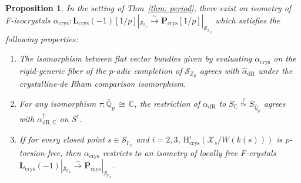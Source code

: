 \documentclass[11pt, letterpaper]{amsart}
\theoremstyle{plain}
\newtheorem{proposition}[theorem]{Proposition}
\theoremstyle{definition}
\newcommand{\IC}{\mathbb{C}}
\newcommand{\IF}{\mathbb{F}}
\newcommand{\IQ}{\mathbb{Q}}
\newcommand{\IZ}{\mathbb{Z}}
\newcommand\iso{\,{\cong}\,}
\newcommand{\<}{\langle}
\renewcommand{\>}{\rangle}
\newcommand{\sX}{\mathcal{X}}
\newcommand{\bL}{\mathbf{L}}
\renewcommand{\H}{\mathrm{H}}
\newcommand{\crys}{\mathrm{crys}}
\newcommand{\sS}{\mathcal{S}}
\newcommand{\bP}{\mathbf{P}}
\newcommand{\dR}{\mathrm{dR}}
\newcommand{\sto}{\stackrel{\sim}{\to}}
\begin{document}
\begin{proposition}
\label{prop: crystalline period} 
    In the setting of Thm~\ref{thm: period}, there exist an isometry of F-isocrystals $\alpha_\crys : \bL_\crys(-1)[1/p]|_{\sS_{\IF_p}} \sto \bP_\crys[1/p]|_{\sS_{\IF_p}}$ which satisfies the following properties: 
    \begin{enumerate}[label=\upshape{(\alph*)}]
       \item The isomorphism between flat vector bundles given by evaluating $\alpha_\crys$ on the rigid-generic fiber of the $p$-adic completion of $\sS_{\IZ_p}$ agrees with $\hat{\alpha}_\dR$ under the crystalline-de Rham comparison isomorphism.  
       \item For any isomorphism $\tau : \bar{\IQ}_p \iso \IC$, the restriction of $\alpha_\dR$ to $S_\IC \stackrel{\tau}{\simeq} S_{\bar{\IQ}_p}$ agrees with $\alpha^\dagger_{\dR, \IC}$ on $S^\dagger$. 
       \item If for every closed point $s \in \sS_{\IF_p}$ and $i = 2, 3$, $\H^i_\crys(\sX_s/W(k(s)))$ is $p$-torsion-free, then $\alpha_\crys$ restricts to an isometry of locally free F-crystals $\bL_\crys(-1)|_{\sS_{\IF_p}} \sto \bP_\crys|_{\sS_{\IF_p}}$.
   \end{enumerate}
\end{proposition}
\end{document}
